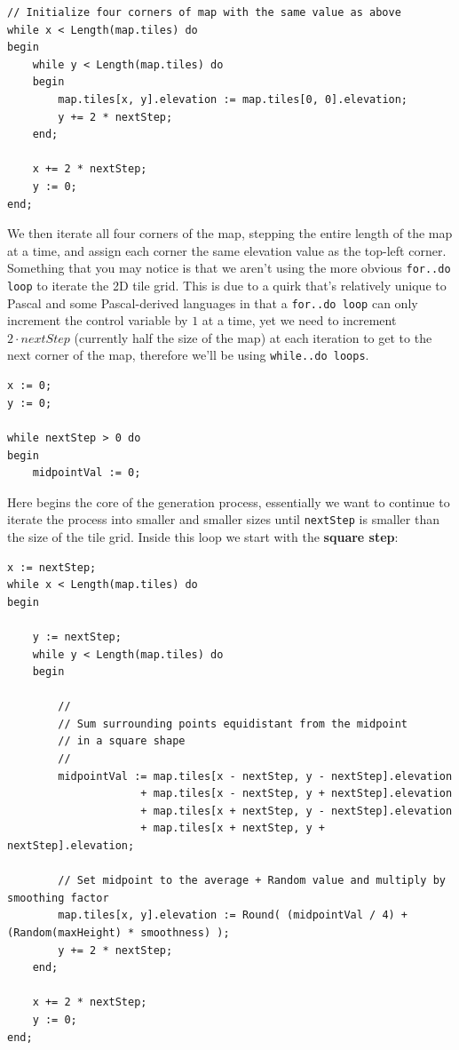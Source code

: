 \documentclass{article}
\begin{document}
\begin{verbatim}
// Initialize four corners of map with the same value as above
while x < Length(map.tiles) do
begin
	while y < Length(map.tiles) do
	begin
		map.tiles[x, y].elevation := map.tiles[0, 0].elevation;
		y += 2 * nextStep;
	end;

	x += 2 * nextStep;
	y := 0;
end;
\end{verbatim}

We then iterate all four corners of the map, stepping the entire length of the map at a time, and assign each corner the same elevation value as the top-left corner. Something that you may notice is that we aren't using the more obvious \texttt{for..do loop} to iterate the 2D tile grid. This is due to a quirk that's relatively unique to Pascal and some Pascal-derived languages in that a \texttt{for..do loop} can only increment the control variable by $1$ at a time, yet we need to increment $2 \cdot nextStep$ (currently half the size of the map) at each iteration to get to the next corner of the map, therefore we'll be using \texttt{while..do loops}.

\begin{verbatim}
x := 0;
y := 0;

while nextStep > 0 do
begin
	midpointVal := 0;
\end{verbatim}

Here begins the core of the generation process, essentially we want to continue to iterate the process into smaller and smaller sizes until \texttt{nextStep} is smaller than the size of the tile grid. Inside this loop we start with the \textbf{square step}:

\begin{verbatim}
x := nextStep;
while x < Length(map.tiles) do
begin

	y := nextStep;
	while y < Length(map.tiles) do
	begin

		//
		// Sum surrounding points equidistant from the midpoint
		// in a square shape
		//
		midpointVal := map.tiles[x - nextStep, y - nextStep].elevation
					 + map.tiles[x - nextStep, y + nextStep].elevation
					 + map.tiles[x + nextStep, y - nextStep].elevation
					 + map.tiles[x + nextStep, y + nextStep].elevation;

		// Set midpoint to the average + Random value and multiply by smoothing factor
		map.tiles[x, y].elevation := Round( (midpointVal / 4) + (Random(maxHeight) * smoothness) );
		y += 2 * nextStep;
	end;

	x += 2 * nextStep;
	y := 0;
end;
\end{verbatim}
\end{document}
